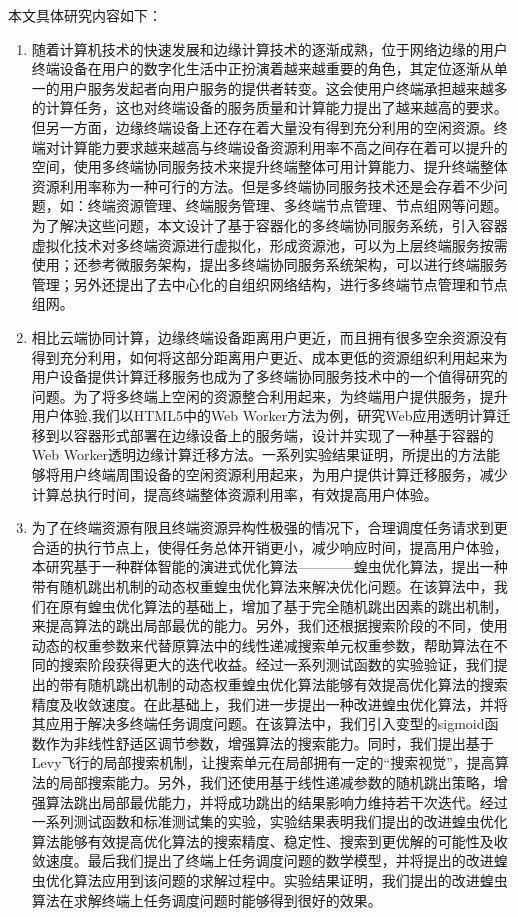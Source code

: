 本文具体研究内容如下：
\begin{enumerate}
    \item 随着计算机技术的快速发展和边缘计算技术的逐渐成熟，位于网络边缘的用户终端设备在用户的数字化生活中正扮演着越来越重要的角色，其定位逐渐从单一的用户服务发起者向用户服务的提供者转变。这会使用户终端承担越来越多的计算任务，这也对终端设备的服务质量和计算能力提出了越来越高的要求。但另一方面，边缘终端设备上还存在着大量没有得到充分利用的空闲资源。终端对计算能力要求越来越高与终端设备资源利用率不高之间存在着可以提升的空间，使用多终端协同服务技术来提升终端整体可用计算能力、提升终端整体资源利用率称为一种可行的方法。但是多终端协同服务技术还是会存着不少问题，如：终端资源管理、终端服务管理、多终端节点管理、节点组网等问题。为了解决这些问题，本文设计了基于容器化的多终端协同服务系统，引入容器虚拟化技术对多终端资源进行虚拟化，形成资源池，可以为上层终端服务按需使用；还参考微服务架构，提出多终端协同服务系统架构，可以进行终端服务管理；另外还提出了去中心化的自组织网络结构，进行多终端节点管理和节点组网。
    \item 相比云端协同计算，边缘终端设备距离用户更近，而且拥有很多空余资源没有得到充分利用，如何将这部分距离用户更近、成本更低的资源组织利用起来为用户设备提供计算迁移服务也成为了多终端协同服务技术中的一个值得研究的问题。为了将多终端上空闲的资源整合利用起来，为终端用户提供服务，提升用户体验,我们以HTML5中的Web Worker方法为例，研究Web应用透明计算迁移到以容器形式部署在边缘设备上的服务端，设计并实现了一种基于容器的Web Worker透明边缘计算迁移方法。一系列实验结果证明，所提出的方法能够将用户终端周围设备的空闲资源利用起来，为用户提供计算迁移服务，减少计算总执行时间，提高终端整体资源利用率，有效提高用户体验。
    \item 为了在终端资源有限且终端资源异构性极强的情况下，合理调度任务请求到更合适的执行节点上，使得任务总体开销更小，减少响应时间，提高用户体验，本研究基于一种群体智能的演进式优化算法————蝗虫优化算法，提出一种带有随机跳出机制的动态权重蝗虫优化算法来解决优化问题。在该算法中，我们在原有蝗虫优化算法的基础上，增加了基于完全随机跳出因素的跳出机制，来提高算法的跳出局部最优的能力。另外，我们还根据搜索阶段的不同，使用动态的权重参数来代替原算法中的线性递减搜索单元权重参数，帮助算法在不同的搜索阶段获得更大的迭代收益。经过一系列测试函数的实验验证，我们提出的带有随机跳出机制的动态权重蝗虫优化算法能够有效提高优化算法的搜索精度及收敛速度。在此基础上，我们进一步提出一种改进蝗虫优化算法，并将其应用于解决多终端任务调度问题。在该算法中，我们引入变型的sigmoid函数作为非线性舒适区调节参数，增强算法的搜索能力。同时，我们提出基于Levy飞行的局部搜索机制，让搜索单元在局部拥有一定的“搜索视觉”，提高算法的局部搜索能力。另外，我们还使用基于线性递减参数的随机跳出策略，增强算法跳出局部最优能力，并将成功跳出的结果影响力维持若干次迭代。经过一系列测试函数和标准测试集的实验，实验结果表明我们提出的改进蝗虫优化算法能够有效提高优化算法的搜索精度、稳定性、搜索到更优解的可能性及收敛速度。最后我们提出了终端上任务调度问题的数学模型，并将提出的改进蝗虫优化算法应用到该问题的求解过程中。实验结果证明，我们提出的改进蝗虫算法在求解终端上任务调度问题时能够得到很好的效果。

\end{enumerate}
